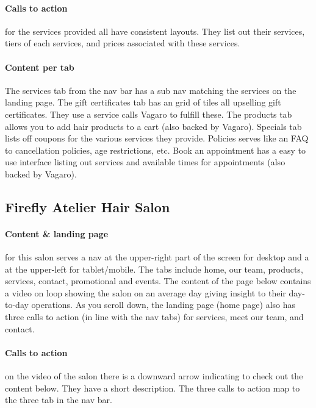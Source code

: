 \paragraph{Calls to action}
for the services provided all have consistent layouts. They list out their services, tiers of each services, and prices associated with these services.

\paragraph{Content per tab}
The services tab from the nav bar has a sub nav matching the services on the landing page. The gift certificates tab has an grid of tiles all upselling gift certificates. They use a service calls Vagaro to fulfill these. The products tab allows you to add hair products to a cart (also backed by Vagaro). Specials tab lists off coupons for the various services they provide. Policies serves like an FAQ to cancellation policies, age restrictions, etc. Book an appointment has a easy to use interface listing out services and available times for appointments (also backed by Vagaro).

\subsection{Firefly Atelier Hair Salon}

\paragraph{Content & landing page}
for this salon serves a nav at the upper-right part of the screen for desktop and a  at the upper-left for tablet/mobile. The tabs include home, our team, products, services, contact, promotional and events. The content of the page below contains a video on loop showing the salon on an average day giving insight to their day-to-day operations. As you scroll down, the landing page (home page) also has three calls to action (in line with the nav tabs) for services, meet our team, and contact.

\paragraph{Calls to action}
on the video of the salon there is a downward arrow indicating to check out the content below. They have a short description. The three calls to action map to the three tab in the nav bar.

